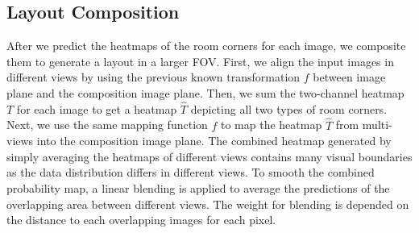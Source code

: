 




\subsection{Layout Composition}
\label{sec:merging}
After we predict the heatmaps of the room corners for each image, we composite them to generate a layout in a larger FOV. 
First, we align the input images in different views by using the previous known transformation $f$ between image plane and the composition image plane. 
Then, we sum the two-channel heatmap $T$ for each image to get a heatmap $\hat{T}$ depicting all two types of room corners. 
Next, we use the same mapping function $f$ to map the heatmap $\hat{T}$ from multi-views into the composition image plane.
%
The combined heatmap generated by simply averaging the heatmaps of different views contains many visual boundaries as the data distribution differs in different views. To smooth the combined probability map, a linear blending is applied to average the predictions of the overlapping area between different views. The weight for blending is depended on the distance to each overlapping images for each pixel.

